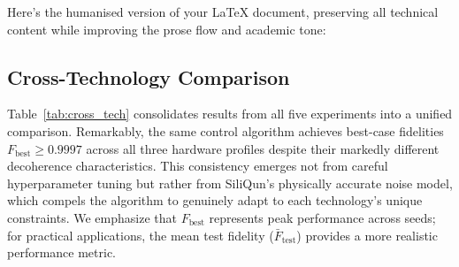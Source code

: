 Here's the humanised version of your LaTeX document, preserving all technical content while improving the prose flow and academic tone:

\subsection{Cross-Technology Comparison}
\label{subsec:cross_tech}

Table~\ref{tab:cross_tech} consolidates results from all five experiments into a unified comparison. Remarkably, the same control algorithm achieves best-case fidelities $F_\text{best} \geq 0.9997$ across all three hardware profiles despite their markedly different decoherence characteristics. This consistency emerges not from careful hyperparameter tuning but rather from SiliQun's physically accurate noise model, which compels the algorithm to genuinely adapt to each technology's unique constraints. We emphasize that $F_\text{best}$ represents peak performance across seeds; for practical applications, the mean test fidelity ($\bar{F}_\text{test}$) provides a more realistic performance metric.

\begin{table}[ht]
\centering
\caption{Cross-technology comparison. The same control algorithm is applied to all three
  hardware profiles using identical hyperparameters. The variation in
  $\bar{F}_\text{cardinal}$ reflects genuine hardware physics differences
  (coherence time, gate speed, charge noise), not simulator bias.
  All mean values are reported over 5 independent seeds;
  95\% confidence intervals are computed as $\bar{F} \pm 1.96\,\sigma/\sqrt{5}$.
  $\tau_g$ = gate duration (not to be confused with $T_2$ decoherence time).}
\label{tab:cross_tech}
\end{table}

